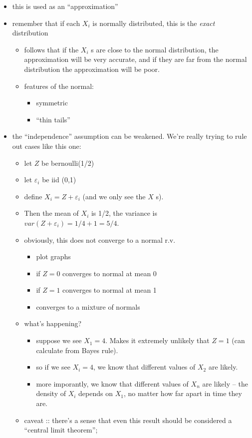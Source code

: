 \begin{itemize}
\item this is used as an ``approximation''
\item remember that if each $X_i$ is normally distributed, this is the
       \emph{exact} distribution
\begin{itemize}
\item follows that if the $X_i$ s are close to the normal
         distribution, the approximation will be very accurate, and if
         they are far from the normal distribution the approximation
         will be poor.
\item features of the normal:
\begin{itemize}
\item symmetric
\item ``thin tails''
\end{itemize}
\end{itemize}
\item the ``independence'' assumption can be weakened.  We're really
       trying to rule out cases like this one:
\begin{itemize}
\item let $Z$ be bernoulli(1/2)
\item let $\varepsilon_i$ be iid (0,1)
\item define $X_i = Z + \varepsilon_i$ (and we only see the $X$ s).
\item Then the mean of $X_i$ is 1/2, the variance is $var(Z +
         \varepsilon_i) = 1/4 + 1 = 5/4$.
\item obviously, this does not converge to a normal r.v.
\begin{itemize}
\item plot graphs
\item if $Z = 0$ converges to normal at mean 0
\item if $Z = 1$ converges to normal at mean 1
\item converges to a mixture of normals
\end{itemize}
\item what's happening?
\begin{itemize}
\item suppose we see $X_1 = 4$.  Makes it extremely unlikely that
           $Z = 1$ (can calculate from Bayes rule).
\item so if we see $X_i = 4$, we know that different values of
           $X_2$ are likely.
\item more imporantly, we know that different values of $X_n$ are
           likely -- the density of $X_i$ depends on $X_1$, no matter
           how far apart in time they are.
\end{itemize}
\item caveat :: there's a sense that even this result should be
                   considered a ``central limit theorem'';
\end{itemize}
\end{itemize}

